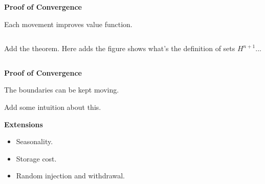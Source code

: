 \documentclass{beamer}
\begin{document}
\begin{frame}
\begin{columns}
{}
\end{columns}
\end{frame}


\begin{frame}
{\bf Proof of Convergence}
\begin{Theorem}
Each movement improves value function.
\end{Theorem}
\begin{columns}
   Add the theorem.
	Here adds the figure shows what's the definition of sets $H^{n+1}...$
\end{columns}

\end{frame}


\begin{frame}
{\bf Proof of Convergence}
\begin{Theorem}
The boundaries can be kept moving.
\end{Theorem}

Add some intuition about this.
\end{frame}


\begin{frame}
{\bf Extensions}

\begin{itemize}
  \item Seasonality.
  \item Storage cost.
  \item Random injection and withdrawal.
\end{itemize}

\end{frame}
\end{document}
